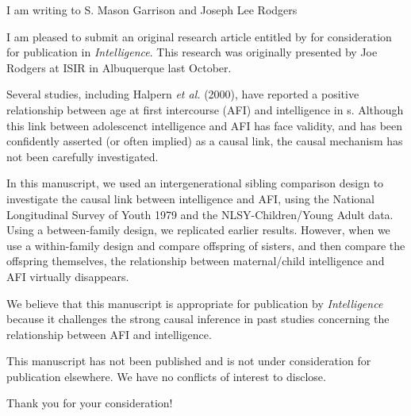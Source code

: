 \documentclass[10pt,stdletter,dateno,sigleft]{newlfm} %
\newcommand{\Position}{S. Mason Garrison and Joseph Lee Rodgers\xspace}
\newcommand{\Journal}{\textit{Intelligence}\xspace}
\newcommand{\Presented}{This research was originally presented by Joe Rodgers at ISIR in Albuquerque last October}
\newcommand{\Goal}{Several studies, including Halpern \textit{et al.} (2000), have reported a positive relationship between age at first intercourse (AFI) and intelligence in s. Although this link between adolescenct intelligence and AFI has face validity, and has been confidently asserted (or often implied) as a causal link, the causal mechanism has not been carefully investigated}
\newcommand{\Findings}{we used an intergenerational sibling comparison design to investigate the causal link between intelligence and AFI, using the National Longitudinal Survey of Youth 1979 and the NLSY-Children/Young Adult data. Using a between-family design, we replicated earlier results. However, when we use a within-family design and compare offspring of sisters, and then compare the offspring themselves, the relationship between maternal/child intelligence and AFI virtually disappears}%
\newcommand{\Scope}{challenges the strong causal inference in past studies concerning the relationship between AFI and intelligence}%
\begin{document}
\begin{newlfm}


I am writing to \Position

I am pleased to submit an original research article entitled \Title by \Authors for consideration for publication in \Journal. \Presented.

\Goal.

In this manuscript, \Findings.

We believe that this manuscript is appropriate for publication by \Journal because it \Scope .

This manuscript has not been published and is not under consideration for publication elsewhere. We have no conflicts of interest to disclose.

Thank you for your consideration!


\end{newlfm}
\end{document}
